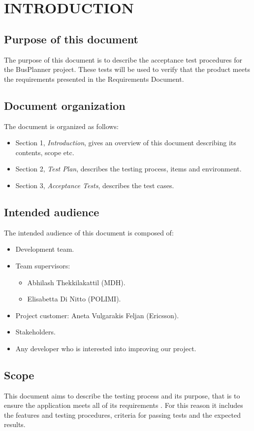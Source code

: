 \section{INTRODUCTION}

\subsection{Purpose of this document}
The purpose of this document is to describe the acceptance test procedures for the BusPlanner project. These tests will be used to verify that the product meets the requirements presented in the Requirements Document.

\subsection{Document organization}
The document is organized as follows:
\begin{itemize}
	\item Section 1, \textit{Introduction}, gives an overview of this document describing its contents, scope etc.
	\item Section 2, \textit{Test Plan}, describes the testing process, items and environment.
	\item Section 3, \textit{Acceptance Tests}, describes the test cases.
\end{itemize}

\subsection{Intended audience}
The intended audience of this document is composed of:
\begin{itemize}
	\item Development team.
	\item Team supervisors:
	\begin{itemize}
		\item Abhilash Thekkilakattil (MDH).
		\item Elisabetta Di Nitto (POLIMI).
	\end{itemize}
	\item Project customer: Aneta Vulgarakis Feljan (Ericsson).
	\item Stakeholders.
	\item Any developer who is interested into improving our project.
\end{itemize}

\subsection{Scope}
This document aims to describe the testing process and its purpose, that is to ensure the application meets all of its requirements	. For this reason it includes the features and testing procedures, criteria for passing tests and the expected results. 

